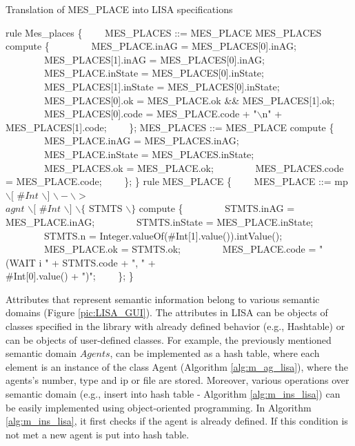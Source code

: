 \documentclass[preprint, prX]{revtex4}
\begin{document}
\begin{algorithm}[tbh]
\caption{Translation of MES\_PLACE into LISA specifications}
\label{alg:mp_lisa}
\footnotesize
\begin{algorithmic}[1]
\STATE rule Mes\_places \{
\STATE \ \ \ \ MES\_PLACES ::= MES\_PLACE MES\_PLACES compute \{
\STATE \ \ \ \ \ \ \ \ MES\_PLACE.inAG = MES\_PLACES[0].inAG;
\STATE \ \ \ \ \ \ \ \ MES\_PLACES[1].inAG = MES\_PLACES[0].inAG;
\STATE \ \ \ \ \ \ \ \ MES\_PLACE.inState = MES\_PLACES[0].inState;
\STATE \ \ \ \ \ \ \ \ MES\_PLACES[1].inState = MES\_PLACES[0].inState;
\STATE \ \ \ \ \ \ \ \ MES\_PLACES[0].ok = MES\_PLACE.ok \&\& MES\_PLACES[1].ok;
\STATE \ \ \ \ \ \ \ \ MES\_PLACES[0].code = MES\_PLACE.code + "$\backslash$n" + \\\hspace{3.7cm} MES\_PLACES[1].code;
\STATE \ \ \ \ \};
\STATE MES\_PLACES ::=  MES\_PLACE compute \{
\STATE \ \ \ \ \ \ \ \ MES\_PLACE.inAG = MES\_PLACES.inAG;
\STATE \ \ \ \ \ \ \ \ MES\_PLACE.inState = MES\_PLACES.inState;
\STATE \ \ \ \ \ \ \ \ MES\_PLACES.ok = MES\_PLACE.ok;
\STATE \ \ \ \ \ \ \ \ MES\_PLACES.code = MES\_PLACE.code;
\STATE \ \ \ \ \};
\STATE \}
\STATE rule MES\_PLACE \{
\STATE \ \ \ \ MES\_PLACE ::= mp $\backslash[$ \#$\mathit{Int}$ $\backslash]$ $\backslash-\backslash>$ \\\hspace{2.7cm} $\mathit{agnt}$
$\backslash[$ \#$\mathit{Int}$ $\backslash]$ $\backslash\{$ STMTS $\backslash\}$ compute \{
\STATE \ \ \ \ \ \ \ \ STMTS.inAG = MES\_PLACE.inAG;
\STATE \ \ \ \ \ \ \ \ STMTS.inState = MES\_PLACE.inState;
\STATE \ \ \ \ \ \ \ \ STMTS.n = Integer.valueOf(\#Int[1].value()).intValue();
\STATE \ \ \ \ \ \ \ \ MES\_PLACE.ok = STMTS.ok;
\STATE \ \ \ \ \ \ \ \ MES\_PLACE.code = "(WAIT i " + STMTS.code + ", " + \\\hspace{3.2cm} \#Int[0].value() + ")";
\STATE \ \ \ \ \};
\STATE \}
\end{algorithmic}
\normalsize
\end{algorithm}



Attributes that represent semantic information belong to various semantic domains (Figure \ref{pic:LISA_GUI}).
The attributes in LISA can be objects of classes specified in the library with already defined behavior (e.g., Hashtable) or can be objects of user-defined classes. For example, the previously mentioned semantic domain $Agents$, can be implemented as a hash table, where each element is an instance of the class Agent (Algorithm \ref{alg:m_ag_lisa}), where the agents's number, type and ip or file are stored. Moreover, various operations over semantic domain (e.g., insert into hash table - Algorithm \ref{alg:m_ins_lisa}) can be easily
implemented using object-oriented programming. In Algorithm \ref{alg:m_ins_lisa}, it first checks if the agent is already defined. If this condition is not met a new agent is put into hash table.
\end{document}
